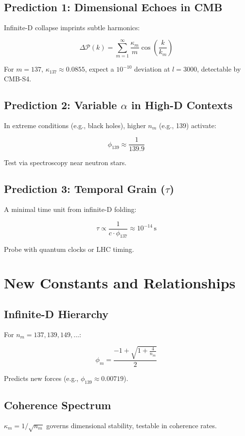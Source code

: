 \documentclass[12pt]{article}
\begin{document}
\subsection{Prediction 1: Dimensional Echoes in CMB}
Infinite-D collapse imprints subtle harmonics:

\[
\Delta \mathcal{P}(k) = \sum_{m=1}^\infty \frac{\kappa_m}{m} \cos\left(\frac{k}{k_m}\right)
\]

For \(m = 137\), \(\kappa_{137} \approx 0.0855\), expect a \(10^{-10}\) deviation at \(l = 3000\), detectable by CMB-S4.

\subsection{Prediction 2: Variable \(\alpha\) in High-D Contexts}
In extreme conditions (e.g., black holes), higher \(n_m\) (e.g., 139) activate:

\[
\phi_{139} \approx \frac{1}{139.9}
\]

Test via spectroscopy near neutron stars.

\subsection{Prediction 3: Temporal Grain (\(\tau\))}
A minimal time unit from infinite-D folding:

\[
\tau \propto \frac{1}{c \cdot \phi_{137}} \approx 10^{-14} \, \text{s}
\]

Probe with quantum clocks or LHC timing.

\section{New Constants and Relationships}

\subsection{Infinite-D Hierarchy}
For \(n_m = 137, 139, 149, \ldots\):

\[
\phi_m = \frac{-1 + \sqrt{1 + \frac{4}{n_m}}}{2}
\]

Predicts new forces (e.g., \(\phi_{139} \approx 0.00719\)).

\subsection{Coherence Spectrum}
\(\kappa_m = 1/\sqrt{n_m}\) governs dimensional stability, testable in coherence rates.
\end{document}
